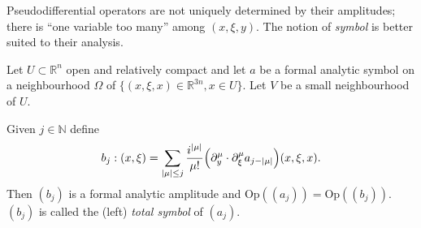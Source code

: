 \documentclass[AHL,Unicode,longabstracts,published]{cedram}
\newcommand{\Opp}{\mathrm{Op}}
\newcommand\1{\mathds{1}}
\newcommand{\R}{\mathbb{R}}
\newcommand{\N}{\mathbb{N}}
\let\originalleft\left
\let\originalright\right
\renewcommand{\left}{\mathopen{}\mathclose\bgroup\originalleft}
\renewcommand{\right}{\aftergroup\egroup\originalright}
\begin{document}
Pseudodifferential operators are not uniquely determined by their amplitudes; there is ``one variable too many'' among $(x,\xi,y)$. The notion of \emph{symbol} is better suited to their analysis.

\begin{prop}\label{prop:ampl_to_symb_pseudos}
Let $U\subset \R^n$ open and relatively compact and let $a$ be a formal analytic symbol on a neighbourhood $\Omega$ of $\{(x,\xi,x)\in \R^{3n},x\in U\}$. Let $V$ be a small neighbourhood of $U$.

Given $j\in \N$ define
\[
b_j:(x,\xi)=\sum_{|\mu|\leq j}\frac{i^{|\mu|}}{\mu!}\left(\partial_y^{\mu}\cdot
\partial_{\xi}^{\mu}a_{j-|\mu|}\right)(x,\xi,x).
\]
Then $(b_j)$ is a formal analytic amplitude and $\Opp((a_j))=\Opp((b_j))$. $(b_j)$ is called the (left)
\emph{total symbol} of $(a_j)$.
\end{prop}
\end{document}
